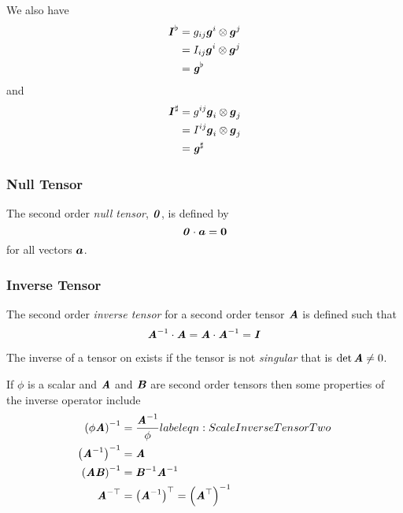 We also have
\begin{equation}
  \begin{aligned}
      \boldsymbol{\mathit{ I }}  ^{\flat}&=g_{ij} \boldsymbol{g}^{i} \otimes \boldsymbol{g}^{j}  \\
    &=I_{ij} \boldsymbol{g}^{i} \otimes \boldsymbol{g}^{j}  \\
    &=\boldsymbol{\mathit{g}}^{\flat}
  \end{aligned}
\end{equation}
and
\begin{equation}
  \begin{aligned}
       \boldsymbol{\mathit{ I }}  ^{\sharp} &=g^{ij} \boldsymbol{g}_{i} \otimes \boldsymbol{g}_{j}   \\
    &=I^{ij} \boldsymbol{g}_{i} \otimes \boldsymbol{g}_{j}  \\
    &= \boldsymbol{\mathit{g}}^{\sharp} 
  \end{aligned}
\end{equation}

\subsubsection{Null Tensor}
\label{subsubsec:NullTensorSecondOrder}

The second order \emph{null tensor}, $ \boldsymbol{\mathit{ 0 }} $, is defined by
\begin{equation}
  \dotprod{\nulltensortwo}{\vectr{a}}=\nulltensorone
  \label{eqn:DefinitionNullSecondOrder}
\end{equation}
for all vectors $\boldsymbol{a}$.

\subsubsection{Inverse Tensor}
\label{subsubsec:InverseTensorSecondOrder}

The second order \emph{inverse tensor} for a second order tensor
$\boldsymbol{\mathit{A}}$ is defined such that
\begin{equation}
   {\ensuremath{\boldsymbol{\mathit{A}}}}^{-1}  \cdot  \boldsymbol{\mathit{A}} = \boldsymbol{\mathit{A}}  \cdot  {\ensuremath{\boldsymbol{\mathit{A}}}}^{-1} =  \boldsymbol{\mathit{ I }}  
\end{equation}

The inverse of a tensor on exists if the tensor is not \emph{singular} that is
$\det \boldsymbol{\mathit{A}}\neq 0$.

If $\phi$ is a scalar and $\boldsymbol{\mathit{A}}$ and $\boldsymbol{\mathit{B}}$ are second order tensors then some
properties of the inverse operator include
\begin{align}
  \inverse{\pbrac{\phi\tensortwo{A}}}&=\dfrac{\inverse{\tensortwo{A}}}{\phi}
  label{eqn:ScaleInverseTensorTwo} \\
  \inverse{\pbrac{\inverse{\tensortwo{A}}}}&=\tensortwo{A}
  \label{eqn:InverseInverseTensorTwo} \\
  \inverse{\pbrac{\tensortwo{A}\tensortwo{B}}}&=\inverse{\tensortwo{B}}\inverse{\tensortwo{A}}
  \label{eqn:ProductInverseTensorTwo} \\
  \invtranspose{\tensortwo{A}}&=\transpose{\pbrac{\inverse{\tensortwo{A}}}}=
  \inverse{\pbrac{\transpose{\tensortwo{A}}}}
  \label{eqn:InverseTransposeInverseTensorTwo}
\end{align}

